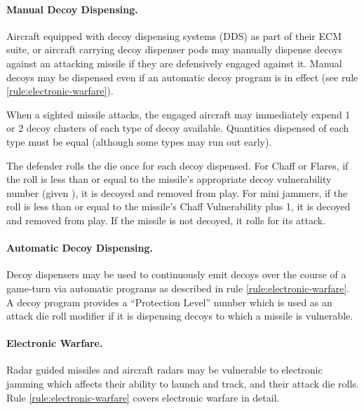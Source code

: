 \paragraph{Manual Decoy Dispensing.} Aircraft equipped with decoy dispensing systems (DDS) as part of their ECM suite, or aircraft carrying decoy dispenser pods may manually dispense decoys against an attacking missile if they are defensively engaged against it. Manual decoys may be dispensed even if an automatic decoy program is in effect (see rule \ref{rule:electronic-warfare}).

When a sighted missile attacks, the engaged aircraft may immediately expend 1 or 2 decoy clusters of each type of decoy available. Quantities dispensed of each type must be equal (although some types may run out early).

The defender rolls the die once for each decoy dispensed. For Chaff or Flares, if the roll is less than or equal to the missile's appropriate decoy vulnerability number (given ), it is decoyed and removed from play. For mini jammers, if the roll is less than or equal to the missile's Chaff Vulnerability plus 1, it is decoyed and removed from play. If the missile is not decoyed, it rolls for its attack.

\paragraph{Automatic Decoy Dispensing.} Decoy dispensers may be used to continuously emit decoys over the course of a game-turn via automatic programs as described in rule \ref{rule:electronic-warfare}. A decoy program provides a “Protection Level” number which is used as an attack die roll modifier if it is dispensing decoys to which a missile is vulnerable.

\paragraph{Electronic Warfare.} Radar guided missiles and aircraft radars may be vulnerable to electronic jamming which affects their ability to launch and track, and their attack die rolls. Rule \ref{rule:electronic-warfare} covers electronic warfare in detail.

